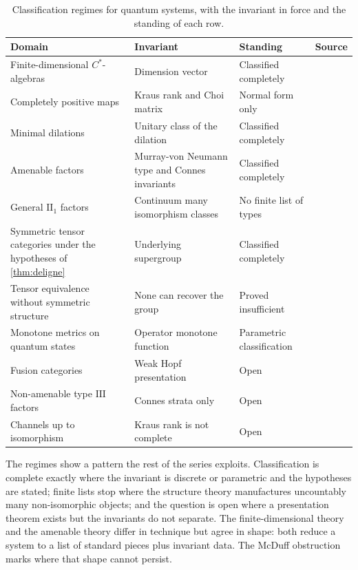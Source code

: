 \documentclass[11pt,letterpaper]{article}
\theoremstyle{definition}
\theoremstyle{remark}
\begin{document}
\begin{table}[ht]
\centering
\caption{Classification regimes for quantum systems, with the invariant in force and the standing of each row.}
\label{tab:regimes}
\small
\begin{tabularx}{\textwidth}{@{}Y Y Y Y@{}}
\toprule
Domain & Invariant & Standing & Source \\
\midrule
Finite-dimensional $C^*$-algebras & Dimension vector & Classified completely &  \\
Completely positive maps & Kraus rank and Choi matrix & Normal form only &  \\
Minimal dilations & Unitary class of the dilation & Classified completely &  \\
Amenable factors & Murray-von Neumann type and Connes invariants & Classified completely &  \\
General $\mathrm{II}_1$ factors & Continuum many isomorphism classes & No finite list of types &  \\
Symmetric tensor categories under the hypotheses of \cref{thm:deligne} & Underlying supergroup & Classified completely &  \\
Tensor equivalence without symmetric structure & None can recover the group & Proved insufficient &  \\
Monotone metrics on quantum states & Operator monotone function & Parametric classification &  \\
Fusion categories & Weak Hopf presentation & Open &  \\
Non-amenable type $\mathrm{III}$ factors & Connes strata only & Open &  \\
Channels up to isomorphism & Kraus rank is not complete & Open &  \\
\bottomrule
\end{tabularx}
\end{table}

The regimes show a pattern the rest of the series exploits. Classification is complete exactly where the invariant is discrete or parametric and the hypotheses are stated; finite lists stop where the structure theory manufactures uncountably many non-isomorphic objects; and the question is open where a presentation theorem exists but the invariants do not separate. The finite-dimensional theory and the amenable theory differ in technique but agree in shape: both reduce a system to a list of standard pieces plus invariant data. The McDuff obstruction marks where that shape cannot persist.
\end{document}
